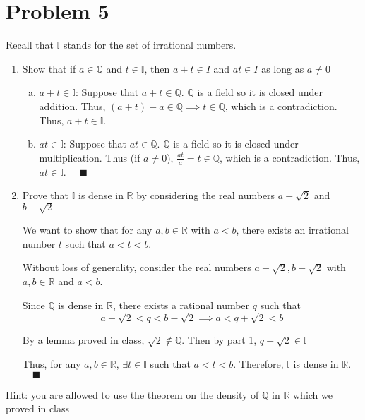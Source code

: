 \documentclass[12pt]{article}
\newcommand{\R}{\mathbb{R}}
\newcommand{\Q}{\mathbb{Q}}
\newcommand{\I}{\mathbb{I}}
\newcommand{\qed}{\quad \blacksquare}
\begin{document}
\section*{Problem 5}
    Recall that $\I$ stands for the set of irrational numbers.
    \begin{enumerate}
        \item Show that if $a \in \Q$ and $t \in \I$, then $a + t \in I$ and $at \in I$ as long as $a \neq 0$
            \color{blue}
                \begin{enumerate}[(a)]
                    \item $a + t \in \I$: Suppose that $a + t \in \Q$. $\Q$ is a field so it is closed under addition. Thus, $(a + t) - a \in \Q \implies t \in \Q$, which is a contradiction. Thus, $a + t \in \I$. 
                    
                    \item $at \in \I$: Suppose that $at \in \Q$. $\Q$ is a field so it is closed under multiplication. Thus (if $a \neq 0$), $\frac{at}{a} = t \in \Q$, which is a contradiction. Thus, $at \in \I$. $\qed$
                \end{enumerate}
            \color{black}

        \item Prove that $\I$ is dense in $\R$ by considering the real numbers $a - \sqrt 2$ and $b - \sqrt 2$ 
        
            \color{blue}
                We want to show that for any $a, b \in \R$ with $a < b$, there exists an irrational number $t$ such that $a < t < b$. 

                Without loss of generality, consider the real numbers $a - \sqrt 2, b - \sqrt 2$ with $a, b \in \R$ and $a < b$.  

                Since $\Q$ is dense in $\R$, there exists a rational number $q$ such that 
                \[a - \sqrt 2 < q < b - \sqrt 2 \implies a < q + \sqrt 2 < b\]
                
                By a lemma proved in class, $\sqrt 2 \notin \Q$. Then by part 1, $q + \sqrt 2 \in \I$  
                
                Thus, for any $a, b \in \R$, $\exists t \in \I$ such that $a < t < b$. Therefore, $\I$ is dense in $\R$. $\qed$
            \color{black}
    \end{enumerate}
    Hint: you are allowed to use the theorem on the density of $\Q$ in $\R$ which we proved in class
\end{document}
